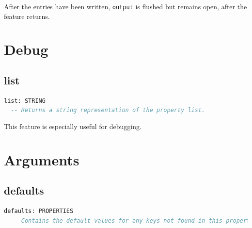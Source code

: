 \documentclass[a4paper,fleqn]{report}
\begin{document}
After the entries have been written, \texttt{output} is flushed but remains
open, after the feature returns.


\section{Debug}
\label{sec:debug}


\subsection{list}
\label{sec:list}

\begin{lstlisting}[language=Eiffel]
list: STRING
  -- Returns a string representation of the property list.
\end{lstlisting}

This feature is especially useful for debugging.

\section{Arguments}
\label{sec:arguments}


\subsection{defaults}
\label{sec:defaults}

\begin{lstlisting}[language=Eiffel]
defaults: PROPERTIES
  -- Contains the default values for any keys not found in this property list
\end{lstlisting}
\end{document}
